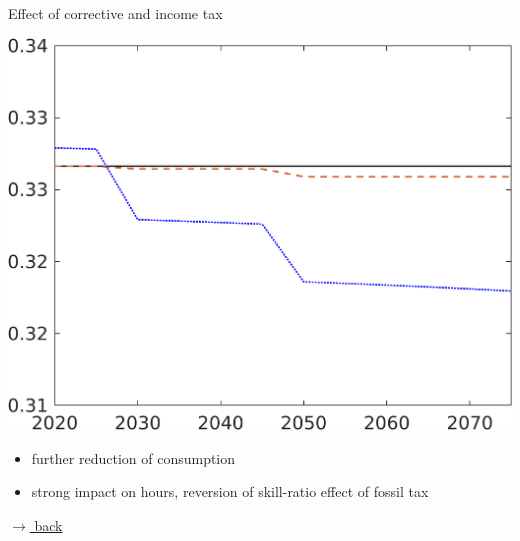 \documentclass[11pt,aspectratio=169]{beamer}
\begin{document}
\begin{frame}{Effect of corrective and income tax}
\begin{minipage}[]{0.3\textwidth}
	\end{minipage}
	\begin{minipage}[]{0.3\textwidth}
		\includegraphics[width=1\textwidth]{../codding_model/own_basedOnFried/optimalPol_elastS_DisuSci/figures/all_1705/CompCounterFac_withLF_taufopt1_taulopt0_hl_spillover0_noskill0_sep1_BN0_ineq0_red0_xgrowth0_etaa0.79_lgd0.png}
	\end{minipage}
	
	\vspace{3mm}
	\begin{itemize}
		\item further reduction of consumption 
		\item strong impact on hours, reversion of skill-ratio effect of fossil tax
		\end{itemize}
	
	
	\vspace{-5mm}
	\hfill
	\hyperlink{effalloback}{\tiny{$\rightarrow$ back}} 
\end{frame}
\end{document}
